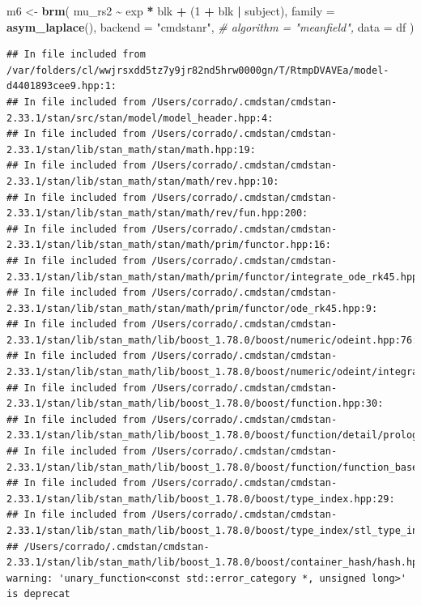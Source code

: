 \documentclass[
]{article}
\newenvironment{Shaded}{\begin{snugshade}}{\end{snugshade}}
\newcommand{\AttributeTok}[1]{\textcolor[rgb]{0.13,0.29,0.53}{#1}}
\newcommand{\CommentTok}[1]{\textcolor[rgb]{0.56,0.35,0.01}{\textit{#1}}}
\newcommand{\DecValTok}[1]{\textcolor[rgb]{0.00,0.00,0.81}{#1}}
\newcommand{\FunctionTok}[1]{\textcolor[rgb]{0.13,0.29,0.53}{\textbf{#1}}}
\newcommand{\NormalTok}[1]{#1}
\newcommand{\OtherTok}[1]{\textcolor[rgb]{0.56,0.35,0.01}{#1}}
\newcommand{\SpecialCharTok}[1]{\textcolor[rgb]{0.81,0.36,0.00}{\textbf{#1}}}
\newcommand{\StringTok}[1]{\textcolor[rgb]{0.31,0.60,0.02}{#1}}
\begin{document}
\begin{Shaded}
\begin{Highlighting}[]
\NormalTok{m6 }\OtherTok{\textless{}{-}} \FunctionTok{brm}\NormalTok{(}
\NormalTok{  mu\_rs2 }\SpecialCharTok{\textasciitilde{}}\NormalTok{ exp }\SpecialCharTok{*}\NormalTok{ blk }\SpecialCharTok{+}\NormalTok{ (}\DecValTok{1} \SpecialCharTok{+}\NormalTok{ blk }\SpecialCharTok{|}\NormalTok{ subject),}
  \AttributeTok{family =} \FunctionTok{asym\_laplace}\NormalTok{(),}
  \AttributeTok{backend =} \StringTok{"cmdstanr"}\NormalTok{,}
  \CommentTok{\# algorithm = "meanfield",}
  \AttributeTok{data =}\NormalTok{ df}
\NormalTok{)}
\end{Highlighting}
\end{Shaded}

\begin{verbatim}
## In file included from /var/folders/cl/wwjrsxdd5tz7y9jr82nd5hrw0000gn/T/RtmpDVAVEa/model-d4401893cee9.hpp:1:
## In file included from /Users/corrado/.cmdstan/cmdstan-2.33.1/stan/src/stan/model/model_header.hpp:4:
## In file included from /Users/corrado/.cmdstan/cmdstan-2.33.1/stan/lib/stan_math/stan/math.hpp:19:
## In file included from /Users/corrado/.cmdstan/cmdstan-2.33.1/stan/lib/stan_math/stan/math/rev.hpp:10:
## In file included from /Users/corrado/.cmdstan/cmdstan-2.33.1/stan/lib/stan_math/stan/math/rev/fun.hpp:200:
## In file included from /Users/corrado/.cmdstan/cmdstan-2.33.1/stan/lib/stan_math/stan/math/prim/functor.hpp:16:
## In file included from /Users/corrado/.cmdstan/cmdstan-2.33.1/stan/lib/stan_math/stan/math/prim/functor/integrate_ode_rk45.hpp:6:
## In file included from /Users/corrado/.cmdstan/cmdstan-2.33.1/stan/lib/stan_math/stan/math/prim/functor/ode_rk45.hpp:9:
## In file included from /Users/corrado/.cmdstan/cmdstan-2.33.1/stan/lib/stan_math/lib/boost_1.78.0/boost/numeric/odeint.hpp:76:
## In file included from /Users/corrado/.cmdstan/cmdstan-2.33.1/stan/lib/stan_math/lib/boost_1.78.0/boost/numeric/odeint/integrate/observer_collection.hpp:23:
## In file included from /Users/corrado/.cmdstan/cmdstan-2.33.1/stan/lib/stan_math/lib/boost_1.78.0/boost/function.hpp:30:
## In file included from /Users/corrado/.cmdstan/cmdstan-2.33.1/stan/lib/stan_math/lib/boost_1.78.0/boost/function/detail/prologue.hpp:17:
## In file included from /Users/corrado/.cmdstan/cmdstan-2.33.1/stan/lib/stan_math/lib/boost_1.78.0/boost/function/function_base.hpp:21:
## In file included from /Users/corrado/.cmdstan/cmdstan-2.33.1/stan/lib/stan_math/lib/boost_1.78.0/boost/type_index.hpp:29:
## In file included from /Users/corrado/.cmdstan/cmdstan-2.33.1/stan/lib/stan_math/lib/boost_1.78.0/boost/type_index/stl_type_index.hpp:47:
## /Users/corrado/.cmdstan/cmdstan-2.33.1/stan/lib/stan_math/lib/boost_1.78.0/boost/container_hash/hash.hpp:132:33: warning: 'unary_function<const std::error_category *, unsigned long>' is deprecat
\end{verbatim}
\end{document}
